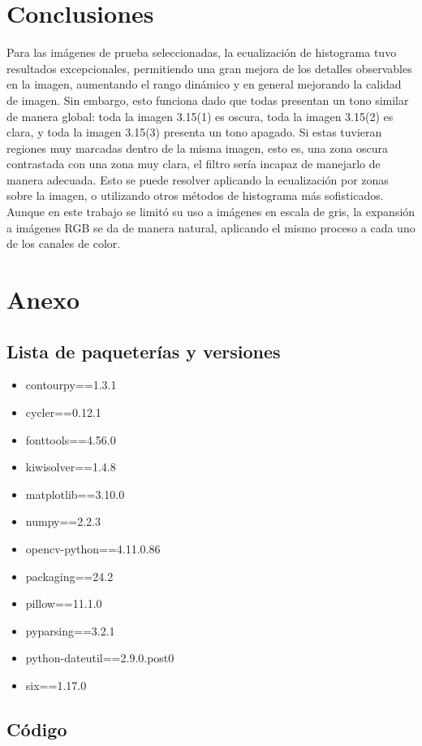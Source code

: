 \documentclass[12pt]{article}
\begin{document}
\section{Conclusiones}
Para las imágenes de prueba seleccionadas, la ecualización de histograma tuvo resultados excepcionales, permitiendo una gran mejora de los detalles observables en la imagen, aumentando el rango dinámico y en general mejorando la calidad de imagen. Sin embargo, esto funciona dado que todas presentan un tono similar de manera global: toda la imagen 3.15(1) es oscura, toda la imagen 3.15(2) es clara, y toda la imagen 3.15(3) presenta un tono apagado. Si estas tuvieran regiones muy marcadas dentro de la misma imagen, esto es, una zona oscura contrastada con una zona muy clara, el filtro sería incapaz de manejarlo de manera adecuada. Esto se puede resolver aplicando la ecualización por zonas sobre la imagen, o utilizando otros métodos de histograma más sofisticados. Aunque en este trabajo se limitó su uso a imágenes en escala de gris, la expansión a imágenes RGB se da de manera natural, aplicando el mismo proceso a cada uno de los canales de color. 





\newpage

\section{Anexo}
\subsection{Lista de paqueterías y versiones}
\begin{itemize}
	\item contourpy==1.3.1
	\item cycler==0.12.1
	\item fonttools==4.56.0
	\item kiwisolver==1.4.8
	\item matplotlib==3.10.0
	\item numpy==2.2.3
	\item opencv-python==4.11.0.86
	\item packaging==24.2
	\item pillow==11.1.0
	\item pyparsing==3.2.1
	\item python-dateutil==2.9.0.post0
	\item six==1.17.0
\end{itemize}

\subsection{Código}


\end{document}
